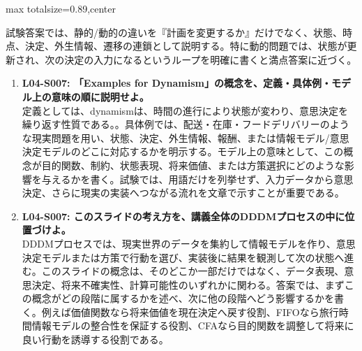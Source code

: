 \begin{minipage}[t]{0.58\textwidth}
\begin{adjustbox}{max totalsize={\textwidth}{0.89\textheight},center}
\begin{minipage}{\textwidth}
試験答案では、静的/動的の違いを『計画を変更するか』だけでなく、状態、時点、決定、外生情報、遷移の連鎖として説明する。特に動的問題では、状態が更新され、次の決定の入力になるというループを明確に書くと満点答案に近づく。\par{}\begin{enumerate}\item \textbf{L04-S007: 「Examples for Dynamism」の概念を、定義・具体例・モデル上の意味の順に説明せよ。}\\定義としては、dynamismは、時間の進行により状態が変わり、意思決定を繰り返す性質である。。具体例では、配送・在庫・フードデリバリーのような現実問題を用い、状態、決定、外生情報、報酬、または情報モデル/意思決定モデルのどこに対応するかを明示する。モデル上の意味として、この概念が目的関数、制約、状態表現、将来価値、または方策選択にどのような影響を与えるかを書く。試験では、用語だけを列挙せず、入力データから意思決定、さらに現実の実装へつながる流れを文章で示すことが重要である。\item \textbf{L04-S007: このスライドの考え方を、講義全体のDDDMプロセスの中に位置づけよ。}\\DDDMプロセスでは、現実世界のデータを集約して情報モデルを作り、意思決定モデルまたは方策で行動を選び、実装後に結果を観測して次の状態へ進む。このスライドの概念は、そのどこか一部だけではなく、データ表現、意思決定、将来不確実性、計算可能性のいずれかに関わる。答案では、まずこの概念がどの段階に属するかを述べ、次に他の段階へどう影響するかを書く。例えば価値関数なら将来価値を現在決定へ戻す役割、FIFOなら旅行時間情報モデルの整合性を保証する役割、CFAなら目的関数を調整して将来に良い行動を誘導する役割である。\end{enumerate}
\end{minipage}
\end{adjustbox}
\end{minipage}


